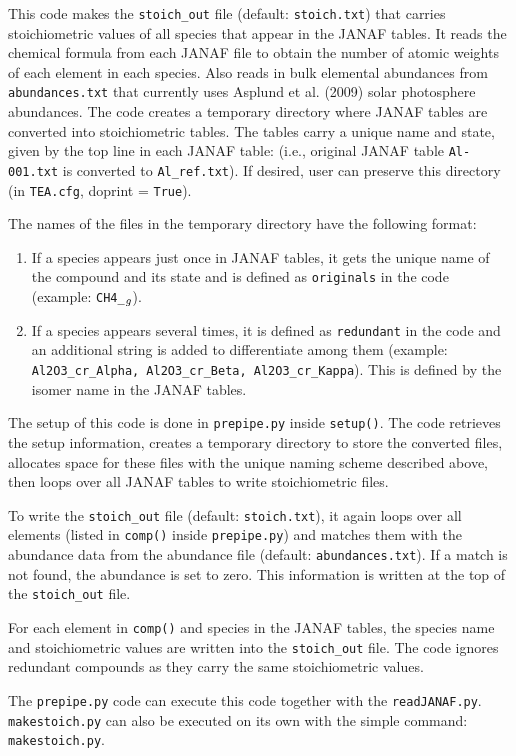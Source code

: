 This code makes the \texttt{stoich\_out} file
(default: \texttt{stoich.txt}) that carries stoichiometric values of
all species that appear in the JANAF tables. It reads the chemical
formula from each JANAF file to obtain the number of atomic weights of
each element in each species. Also reads in bulk elemental abundances
from \texttt{abundances.txt} that currently uses Asplund et al. (2009)
solar photosphere abundances. The code creates a temporary directory
where JANAF tables are converted into stoichiometric tables. The
tables carry a unique name and state, given by the top line in each
JANAF table: (i.e., original JANAF table \texttt{Al-001.txt} is
converted to \texttt{Al\_ref.txt}).  If desired, user can preserve
this directory (in \texttt{TEA.cfg}, doprint = \texttt{True}).

The names of the files in the temporary directory have the following
format: {
\begin{enumerate}
\setlength\itemsep{0ex}
\setlength\topsep{0ex}
\setlength\partopsep{0ex}
\setlength\parsep{0ex}

   \item If a species appears just once in JANAF tables, it gets the
   unique name of the compound and its state and is defined
   as \texttt{originals} in the code
   (example: \texttt{CH4\_$\sb{g}$}).  \item If a species appears
   several times, it is defined as \texttt{redundant} in the code and
   an additional string is added to differentiate among them
   (example: \texttt{Al2O3\_{cr}\_{Alpha}, \newline
   Al2O3\_{cr}\_{Beta}, Al2O3\_{cr}\_{Kappa}}). This is defined by the
   isomer name in the JANAF tables.
\end{enumerate}


The setup of this code is done in \texttt{prepipe.py}
inside \texttt{setup()}. The code retrieves the setup information,
creates a temporary directory to store the converted files, allocates
space for these files with the unique naming scheme described above,
then loops over all JANAF tables to write stoichiometric files.

To write the \texttt{stoich\_{out}} file
(default: \texttt{stoich.txt}), it again loops over all elements
(listed in \texttt{comp()} inside \texttt{prepipe.py}) and matches
them with the abundance data from the abundance file (default:
\texttt{abundances.txt}). If a match is not found, the abundance is set to
zero. This information is written at the top of
the \texttt{stoich\_{out}} file.

For each element in \texttt{comp()} and species in the JANAF tables,
the species name and stoichiometric values are written into
the \texttt{stoich\_{out}} file. The code ignores redundant compounds
as they carry the same stoichiometric values.

The \texttt{prepipe.py} code can execute this code together with
the \texttt{readJANAF.py}. \newline
\texttt{makestoich.py} can also be executed on its own with the simple
 command: \texttt{makestoich.py}. 

}

